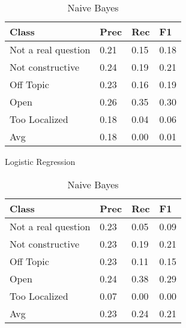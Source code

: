 \begin{table}[!htpb]
\centering
\begin{minipage}{.5\linewidth}
    \begin{tabular}{|l|l|l|l|} \hline
    \textbf{Class}& \textbf{Prec} & \textbf{Rec} & \textbf{F1} \\ \hline
    Not a real question & 0.21      & 0.15   & 0.18     \\
    Not constructive    & 0.24      & 0.19   & 0.21     \\
    Off Topic           & 0.23      & 0.16   & 0.19     \\
    Open                & 0.26      & 0.35   & 0.30     \\
    Too Localized       & 0.18      & 0.04   & 0.06     \\ \hline
    Avg                 & 0.18      & 0.00   & 0.01   \\ \hline  
    \end{tabular}
    \caption{Logistic Regression}
    \label{tab3:lr}
\end{minipage}%
\begin{minipage}{.5\linewidth}
    \begin{tabular}{|l|l|l|l|} \hline
    \textbf{Class}& \textbf{Prec} & \textbf{Rec} & \textbf{F1} \\ \hline
    Not a real question & 0.23      & 0.05   & 0.09     \\
    Not constructive    & 0.23      & 0.19   & 0.21     \\
    Off Topic           & 0.23      & 0.11   & 0.15     \\
    Open                & 0.24      & 0.38   & 0.29     \\
    Too Localized       & 0.07      & 0.00   & 0.00     \\ \hline
    Avg                 & 0.23      & 0.24   & 0.21   \\ \hline  
    \end{tabular}
    \caption{Naive Bayes}
    \label{tab3:nb}
\end{minipage}
\end{table}


